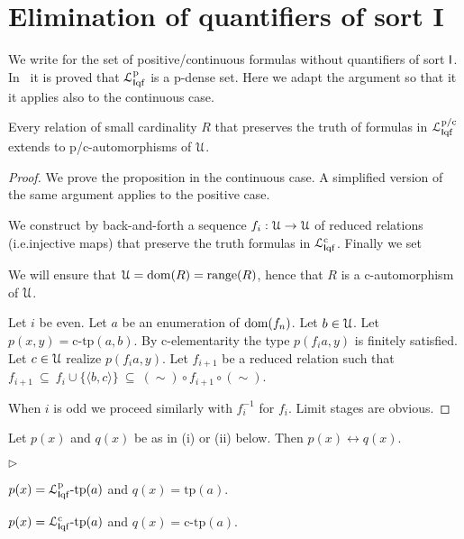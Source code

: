 \documentclass{amsproc}
\newcommand{\mylabel}[1]{{#1}\hfill}
\renewenvironment{itemize}
  {\begin{list}{$\triangleright$}{%
  \setlength{\parskip}{0mm}
  \setlength{\topsep}{.4\baselineskip}
  \setlength{\rightmargin}{0mm}
  \setlength{\listparindent}{0mm}
  \setlength{\itemindent}{0mm}
  \setlength{\labelwidth}{3ex}
  \setlength{\itemsep}{.2\baselineskip}
  \setlength{\parsep}{.2\baselineskip}
  \setlength{\partopsep}{0mm}
  \setlength{\labelsep}{1ex}
  \setlength{\leftmargin}{\labelwidth+\labelsep}
  \let\makelabel\mylabel}}{%
\end{list}}
\renewcommand*{\emph}[1]{%
   \smash{\tikz[baseline]\node[rectangle, fill=teal!25, rounded corners, inner xsep=0.5ex, inner ysep=0.2ex, anchor=base, minimum height = 2.7ex]{\strut #1};}}
\begin{document}
{%
\section{Elimination of quantifiers of sort \textsf{I}}\label{cIelimination}

We write \emph{${\EuScript L}^{\rm p/c}_{{\sf I}{\rm qf}}$} for the set of positive/continuous formulas without quantifiers of sort ${\sf I}$.
In~\cite{clcl} it is proved that ${\EuScript L}^{\rm p}_{{\sf I}{\rm qf}}$ is a p-dense set.
Here we adapt the argument so that it it applies also to the continuous case.

\begin{proposition}\label{prop_Iqf_elim}
  Every relation of small cardinality $R$ that preserves the truth of formulas in ${\EuScript L}^{\rm p/c}_{{\sf I}{\rm qf}}$ extends to p/c-automorphisms of ${\EuScript U}$.
\end{proposition}

\begin{proof}
  We prove the proposition in the continuous case.
  A simplified version of the same argument applies to the positive case.

  We construct by back-and-forth a sequence $f_i:{\EuScript U}\rightarrow{\EuScript U}$ of reduced relations (i.e.\@ injective maps) that preserve the truth formulas in ${\EuScript L}^{\rm c}_{{\sf I}{\rm qf}}$.
  Finally we set 
  

  We will ensure that ${\EuScript U}={\rm dom}(R)={\rm range}(R)$, hence that $R$ is a c-automorphism of ${\EuScript U}$.

  Let $i$ be even.
  Let $a$ be an enumeration of ${\rm dom}(f_n)$.
  Let $b\in{\EuScript U}$. 
  Let $p(x,y)=\mbox{c-tp}(a,b)$.
  By c-elementarity the type $p(f_ia,y)$ is finitely satisfied.
  Let $c\in{\EuScript U}$ realize $p(f_ia,y)$.
  Let $f_{i+1}$ be a reduced relation such that $f_{i+1}\ \subseteq\ f_i\cup\{\langle b,c\rangle\}\ \subseteq\ (\sim)\circ f_{i+1}\circ(\sim)$.

  When $i$ is odd we proceed similarly with $f_i^{-1}$ for $f_i$.
  Limit stages are obvious.
\end{proof}

\begin{corollary}\label{corol_cLcomplete}
  Let $p(x)$ and $q(x)$ be as in (i) or (ii) below.
  Then $p(x)\leftrightarrow q(x)$.
  \begin{itemize}
    \item[i.] $p(x)={\EuScript L}^{\rm p}_{{\sf I}{\rm qf}}\mbox{-tp}(a)$ and $q(x)=\mbox{tp}(a)$.
    \item[ii.] $p(x)={\EuScript L}^{\rm c}_{{\sf I}{\rm qf}}\mbox{-tp}(a)$ and $q(x)=\mbox{c-tp}(a)$.
  \end{itemize}
\end{corollary}

}
\end{document}
